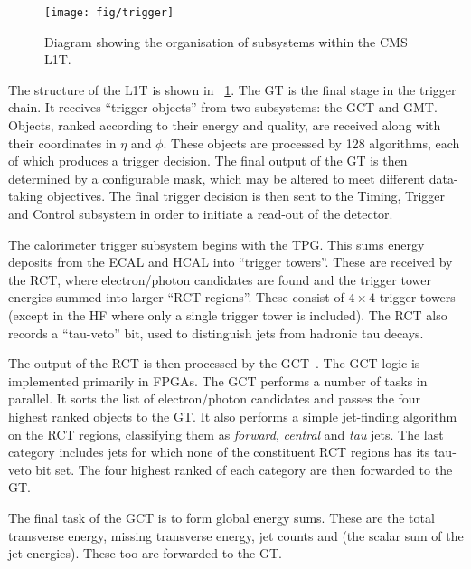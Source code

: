 \begin{figure}[h!]
\centering
\texttt{[image: fig/trigger]}
\caption[Diagram showing the organisation of the \acs{CMS} \acs{L1T}]{Diagram
  showing the organisation of subsystems within the \ac{CMS} \ac{L1T}.}
\label{fig:expt_cms_trigger}
\end{figure}

The structure of the \ac{L1T} is shown in \fig~\ref{fig:expt_cms_trigger}. The
\ac{GT} is the final stage in the trigger chain. It receives ``trigger objects''
from two subsystems: the \ac{GCT} and \ac{GMT}. Objects, ranked according to
their energy and quality, are received along with their coordinates in $\eta$
and $\phi$. These objects are processed by 128 algorithms, each of which
produces a trigger decision. The final output of the \ac{GT} is then determined
by a configurable mask, which may be altered to meet different data-taking
objectives. The final trigger decision is then sent to the Timing, Trigger and
Control subsystem in order to initiate a read-out of the detector.

The calorimeter trigger subsystem begins with the \ac{TPG}. This sums energy
deposits from the \ac{ECAL} and \ac{HCAL} into ``trigger towers''. These are
received by the \ac{RCT}, where electron/photon candidates are found and the
trigger tower energies summed into larger ``\ac{RCT} regions''. These consist
of $4\times 4$ trigger towers (except in the \ac{HF} where only a single trigger
tower is included). The \ac{RCT} also records a ``tau-veto'' bit, used to
distinguish jets from hadronic tau decays.

The output of the \ac{RCT} is then processed by the
\ac{GCT}~\cite{jj_thesis}. The \ac{GCT} logic is implemented primarily in
\acp{FPGA}. The \ac{GCT} performs a number of tasks in parallel. It sorts the
list of electron/photon candidates and passes the four highest ranked objects to
the \ac{GT}. It also performs a simple jet-finding algorithm on the \ac{RCT}
regions, classifying them as \emph{forward}, \emph{central} and \emph{tau}
jets. The last category includes jets for which none of the constituent \ac{RCT}
regions has its tau-veto bit set. The four highest ranked of each category are
then forwarded to the \ac{GT}.

The final task of the \ac{GCT} is to form global energy sums. These are the
total transverse energy, missing transverse energy, jet counts and \HT (the
scalar sum of the jet energies). These too are forwarded to the \ac{GT}.

